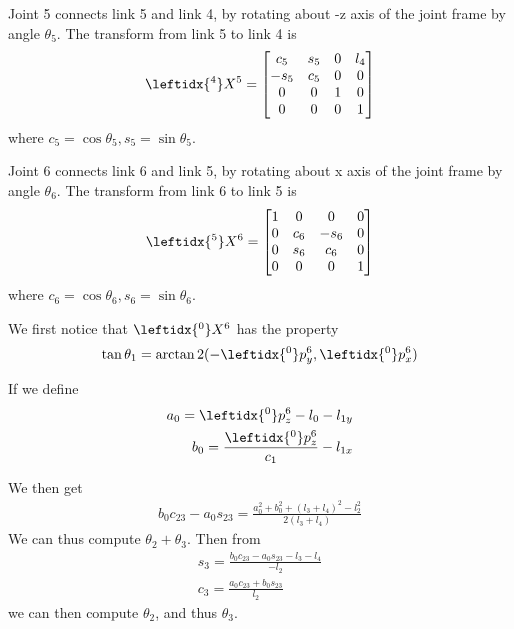 \documentclass{article}
\begin{document}
Joint 5 connects link 5 and link 4, by rotating about -z axis of the joint frame by angle $\theta_5$. The transform from link 5 to link 4 is
\begin{align}
	\leftidx{^4}X^5 = \begin{bmatrix}
		c_5 & s_5 & 0 & l_4\\
		-s_5 & c_5 & 0 & 0\\
		0 & 0 & 1 & 0\\
		0 & 0 & 0 & 1
	\end{bmatrix}
\end{align}
where $c_5=\cos\theta_5,s_5=\sin\theta_5$.

Joint 6 connects link 6 and link 5, by rotating about x axis of the joint frame by angle $\theta_6$. The transform from link 6 to link 5 is
\begin{align}
	\leftidx{^5}X^6 = \begin{bmatrix}
		1 & 0 & 0 & 0\\
		0 & c_6 & -s_6 & 0\\
		0 & s_6 & c_6 & 0\\
		0 & 0 & 0 & 1
	\end{bmatrix}
\end{align}
where $c_6=\cos\theta_6, s_6=\sin\theta_6$.

We first notice that $\leftidx{^0}X^6$ has the property
\begin{align}
	\tan\theta_1 = \arctan2(-\leftidx{^0}p^6_y, \leftidx{^0}p^6_x)
\end{align}

If we define
\begin{align}
	a_0 = \leftidx{^0}p^6_z - l_0 - l_{1y}\\
	b_0 = \frac{\leftidx{^0}p^6_z}{c_1}-l_{1x}
\end{align}

We then get 
\begin{align}
	b_0c_{23}-a_0s_{23} = \frac{a_0^2 + b_0^2 + (l_3 + l_4)^2 - l_2^2}{2(l_3 + l_4)}
\end{align}
We can thus compute $\theta_2 + \theta_3$. Then from
\begin{align}
	s_3 = \frac{b_0c_{23}-a_0s_{23}-l_3 - l_4}{-l_2}\\
	c_3 = \frac{a_0c_{23} + b_0s_{23}}{l_2}
\end{align}
we can then compute $\theta_2$, and thus $\theta_3$.
\end{document}
